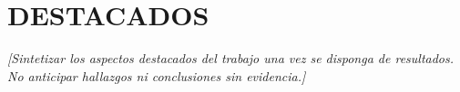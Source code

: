 \chapter*{DESTACADOS}

\textit{[Sintetizar los aspectos destacados del trabajo una vez se disponga de
resultados. No anticipar hallazgos ni conclusiones sin evidencia.]}
